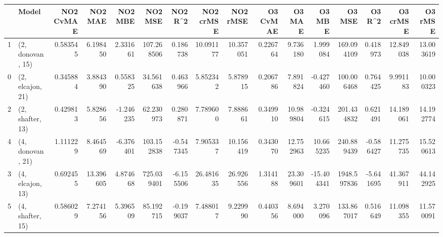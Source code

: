 \begin{tabular}{llrrrrrrrrrrrrrr}
\toprule
{} &             Model &  NO2 CvMAE &    NO2 MAE &   NO2 MBE &     NO2 MSE &   NO2 R\textasciicircum2 &  NO2 crMSE &   NO2 rMSE &  O3 CvMAE &     O3 MAE &     O3 MBE &       O3 MSE &    O3 R\textasciicircum2 &   O3 crMSE &    O3 rMSE \\
\midrule
1 &  (2, donovan, 15) &   0.583545 &   6.198450 &  2.331661 &  107.268506 &  0.186738 &  10.091177 &  10.357051 &  0.226764 &   9.736180 &   1.999084 &   169.094109 &  0.418973 &  12.849038 &  13.003619 \\
0 &  (2, elcajon, 21) &   0.345884 &   3.884390 &  0.558325 &   34.561638 &  0.463966 &   5.852342 &   5.878915 &  0.206786 &   7.891824 &  -0.427460 &   100.006468 &  0.764425 &   9.991183 &  10.000323 \\
2 &  (2, shafter, 13) &   0.429813 &   5.828656 & -1.246235 &   62.230973 &  0.280871 &   7.789600 &   7.888661 &  0.349910 &  10.989804 &  -0.324615 &   201.434832 &  0.621491 &  14.189061 &  14.192774 \\
4 &  (4, donovan, 21) &   1.111229 &   8.464569 & -6.376401 &  103.152838 & -0.547345 &   7.905337 &  10.156419 &  0.343070 &  12.752963 &  10.665235 &   240.889439 & -0.586427 &  11.275735 &  15.520613 \\
3 &  (4, elcajon, 13) &   0.692455 &  13.396605 &  4.874668 &  725.039401 & -6.155506 &  26.481635 &  26.926556 &  1.314188 &  23.309601 & -15.404341 &  1948.597836 & -5.641695 &  41.367911 &  44.142925 \\
5 &  (4, shafter, 15) &   0.586029 &   7.274156 &  5.396509 &   85.192715 & -0.199037 &   7.488017 &   9.229990 &  0.440356 &   8.694000 &   3.270096 &   133.867017 &  0.516649 &  11.098355 &  11.570091 \\
\bottomrule
\end{tabular}
